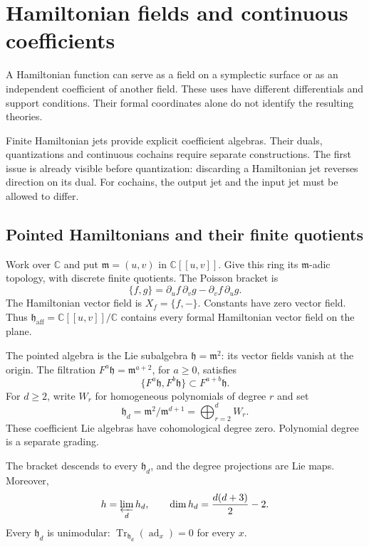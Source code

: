 \chapter{Hamiltonian fields and continuous coefficients}
\label{mht:ch:hamiltonian-coefficients}

A Hamiltonian function can serve as a field on a symplectic surface
or as an independent coefficient of another field. These uses have
different differentials and support conditions. Their formal
coordinates alone do not identify the resulting theories.

Finite Hamiltonian jets provide explicit coefficient algebras.
Their duals, quantizations and continuous cochains require separate
constructions. The first issue is already visible before
quantization: discarding a Hamiltonian jet reverses direction on its
dual. For cochains, the output jet and the input jet must be allowed
to differ.

\section{Pointed Hamiltonians and their finite quotients}

Work over $\mathbb C$ and put $\mathfrak m=(u,v)$ in
$\mathbb C[[u,v]]$. Give this ring its $\mathfrak m$-adic topology,
with discrete finite quotients. The Poisson bracket is
\begin{equation}\label{mht:eq:ham-poisson}
 \{f,g\}=\partial_uf\,\partial_vg-\partial_vf\,\partial_ug.
\end{equation}
The Hamiltonian vector field is $X_f=\{f,-\}$.
Constants have zero vector field. Thus
$\mathfrak h_{\mathrm{aff}}=\mathbb C[[u,v]]/\mathbb C$
contains every formal Hamiltonian vector field on the plane.

The pointed algebra is the Lie subalgebra
$\mathfrak h=\mathfrak m^2$: its vector fields vanish at the origin.
The filtration $F^a\mathfrak h=\mathfrak m^{a+2}$, for $a\geq0$,
satisfies
\[
 \{F^a\mathfrak h,F^b\mathfrak h\}\subset F^{a+b}\mathfrak h.
\]
For $d\geq2$, write $W_r$ for homogeneous polynomials of degree $r$
and set
\[
 \mathfrak h_d=\mathfrak m^2/\mathfrak m^{d+1}
              =\bigoplus_{r=2}^dW_r.
\]
These coefficient Lie algebras have cohomological degree zero.
Polynomial degree is a separate grading.

\begin{proposition}\label{mht:prop:pointed-jets}
The bracket descends to every $\mathfrak h_d$, and the degree
projections are Lie maps. Moreover,
\[
 \mathfrak h=\varprojlim_d\mathfrak h_d,\qquad
 \dim\mathfrak h_d=\frac{d(d+3)}2-2.
\]
Every $\mathfrak h_d$ is unimodular:
$\operatorname{Tr}_{\mathfrak h_d}(\operatorname{ad}_x)=0$
for every $x$.
\end{proposition}


